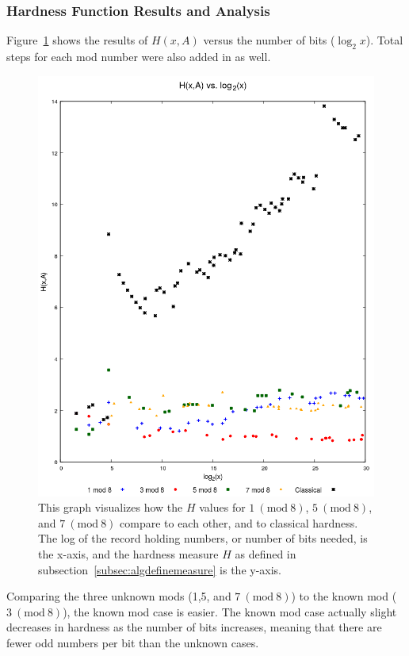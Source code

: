 \documentclass[12pt]{article}
\newcommand{\Mod}[1]{\ (\mathrm{mod}\ #1)}
\theoremstyle{definition}
\begin{document}
\subsubsection{Hardness Function Results and Analysis} \label{subsubsec:algsinhardness}
Figure~\ref{fig:hvslog} shows the results of $H(x,A)$ versus the number of bits ($\log_2{x}$). Total steps for each mod number were also added in as well.\par
\begin{figure}
    \centering
    \includegraphics[scale=0.75]{ModAvoidanceAnalysisPics/H_vs_log.png}
    \caption{This graph visualizes how the $H$ values for $1 \Mod{8}$, $5 \Mod{8}$, and $7 \Mod{8}$ compare to each other, and to classical hardness. The log of the record holding numbers, or number of bits needed, is the x-axis, and the hardness measure $H$ as defined in subsection~\ref{subsec:algdefinemeasure} is the y-axis.}
    \label{fig:hvslog}
\end{figure}
Comparing the three unknown mods (1,5, and $7 \Mod{8}$) to the known mod ($3 \Mod{8}$), the known mod case is easier. The known mod case actually slight decreases in hardness as the number of bits increases, meaning that there are fewer odd numbers per bit than the unknown cases. \par
\end{document}
